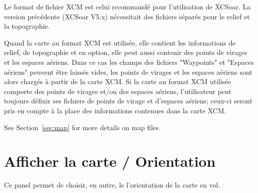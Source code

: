 
Le format de fichier XCM est celui recommandé pour l'utilisation de XCSoar. La version précédente (XCSoar V5.x) nécessitait des fichiers séparés pour le relief et la topographie.

Quand la carte au format XCM est utilisée, elle contient les informations de relief, de topographie et en option, elle peut aussi contenir des points de virages et les espaces aériens. Dans ce cas les champs des fichiers "Waypoints" et "Espaces aériens" peuvent être laissés vides, les points de virages et les espaces aériens sont alors chargés à partir de la carte XCM. Si la carte au format XCM utilisée comporte des points de virages et/ou des espaces aériens, l'utilisateur peut toujours définir ses fichiers de points de virage et d'espaces aériens; ceux-ci seront pris en compte à la place des informations contenues dans la carte XCM.

See Section~\ref{sec:map} for more details on map files.


\section{Afficher la carte / Orientation}\label{sec:map-projection}

Ce panel permet de choisir, en autre, le l'orientation de la carte en vol.

